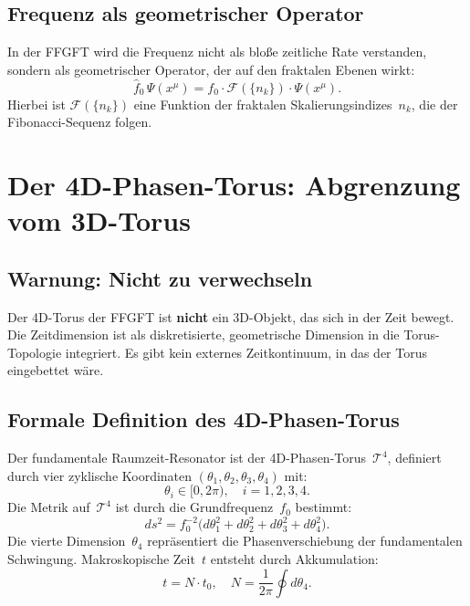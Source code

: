 \subsection{Frequenz als geometrischer Operator}

In der FFGFT wird die Frequenz nicht als bloße zeitliche Rate verstanden,
sondern als geometrischer Operator, der auf den fraktalen Ebenen wirkt:
\begin{equation}
  \hat{f}_0\,\Psi(x^\mu) = f_0 \cdot \mathcal{F}(\{n_k\}) \cdot \Psi(x^\mu).
\end{equation}
Hierbei ist $\mathcal{F}(\{n_k\})$ eine Funktion der fraktalen
Skalierungsindizes~$n_k$, die der Fibonacci-Sequenz folgen.

\section{Der 4D-Phasen-Torus: Abgrenzung vom 3D-Torus}

\subsection{Warnung: Nicht zu verwechseln}

\begin{warnbox}
Der 4D-Torus der FFGFT ist \textbf{nicht} ein 3D-Objekt, das sich in der
Zeit bewegt. Die Zeitdimension ist als diskretisierte, geometrische Dimension
in die Torus-Topologie integriert. Es gibt kein externes Zeitkontinuum, in das
der Torus eingebettet wäre.
\end{warnbox}

\subsection{Formale Definition des 4D-Phasen-Torus}

Der fundamentale Raumzeit-Resonator ist der 4D-Phasen-Torus~$\mathcal{T}^4$,
definiert durch vier zyklische Koordinaten $(\theta_1, \theta_2, \theta_3,
\theta_4)$ mit:
\begin{equation}
  \theta_i \in [0, 2\pi),\quad i = 1,2,3,4.
\end{equation}
Die Metrik auf~$\mathcal{T}^4$ ist durch die Grundfrequenz~$f_0$
bestimmt:
\begin{equation}
  ds^2 = f_0^{-2}
         \bigl(d\theta_1^2 + d\theta_2^2 + d\theta_3^2 + d\theta_4^2\bigr).
  \label{eq:metric}
\end{equation}
Die vierte Dimension~$\theta_4$ repräsentiert die Phasenverschiebung der
fundamentalen Schwingung. Makroskopische Zeit~$t$ entsteht durch Akkumulation:
\begin{equation}
  t = N \cdot t_0, \quad N = \frac{1}{2\pi}\oint d\theta_4.
\end{equation}

